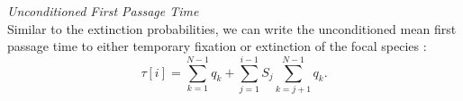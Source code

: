 \emph{Unconditioned First Passage Time} \\
Similar to the extinction probabilities, we can write the unconditioned mean first passage time to either temporary fixation or extinction of the focal species \cite{Nisbet1982}:
\begin{equation}
\tau[i] = \sum_{k=1}^{N-1}q_k + \sum_{j=1}^{i-1}S_{j}\sum_{k=j+1}^{N-1}q_k. 
\end{equation}
